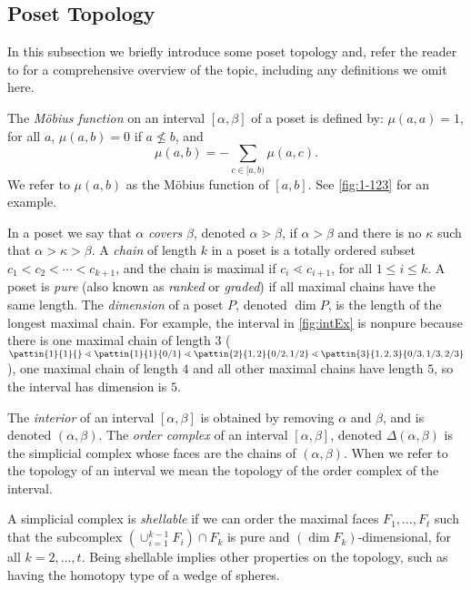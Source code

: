 \documentclass[11pt,a4paper,oneside]{article}
\begin{document}
\subsection{Poset Topology}
In this subsection we briefly introduce some poset topology and, refer the reader to \cite{Wac07}
for a comprehensive overview of the topic, including any definitions we omit here.

The \emph{M\"obius function} on an interval $[\alpha,\beta]$ of a poset is defined by:
$\mu(a,a)=1$, for all $a$, $\mu(a,b)=0$ if $a\not\le b$, and $$\mu(a,b)=-\sum_{c\in[a,b)}\mu(a,c).$$
We refer to $\mu(a,b)$ as the M\"obius function of $[a,b]$. See \cref{fig:1-123} for an example.

In a poset we say that $\alpha$ \emph{covers} $\beta$, denoted $\alpha\gtrdot\beta$, if $\alpha>\beta$
and there is no $\kappa$ such that $\alpha>\kappa>\beta$. A \emph{chain} of length $k$ in a poset is
a totally ordered subset $c_1<c_2<\cdots<c_{k+1}$, and the chain is maximal if $c_i\lessdot c_{i+1}$,
for all $1\le i \le k$. A poset is \emph{pure} (also known as \emph{ranked} or \emph{graded}) if all
maximal chains have the same length. The \emph{dimension} of a poset $P$, denoted $\dim P$, is the
length of the longest maximal chain. For example, the interval in \cref{fig:intEx} is nonpure because
there is one maximal chain of length $3$ ($\pattin{1}{1}{}\lessdot\pattin{1}{1}{0/1}\lessdot
\pattin{2}{1,2}{0/2,1/2}\lessdot\pattin{3}{1,2,3}{0/3,1/3,2/3}$), one maximal chain of length $4$
and all other maximal chains have length $5$, so the interval has dimension is $5$.

The \emph{interior} of an interval $[\alpha,\beta]$ is obtained by removing $\alpha$ and $\beta$,
and is denoted $(\alpha,\beta)$. The \emph{order complex} of an interval $[\alpha,\beta]$, denoted
$\Delta(\alpha,\beta)$ is the simplicial complex whose faces are the chains of $(\alpha,\beta)$.
When we refer to the topology of an interval we mean the topology of the order complex of the interval.


A simplicial complex is \emph{shellable} if we can order the maximal faces $F_1,\ldots,F_t$
such that the subcomplex $\left(\cup_{i=1}^{k-1}F_i\right)\cap F_k$ is pure and
$(\dim F_k)$-dimensional, for all $k=2,\ldots,t$. Being shellable implies other properties
on the topology, such as having the homotopy type of a wedge of spheres.
\end{document}
